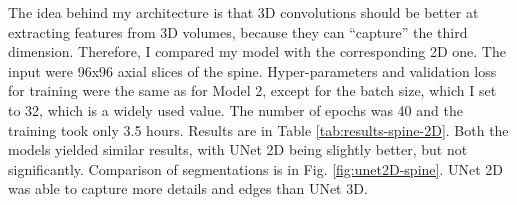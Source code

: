 The idea behind my architecture is that 3D convolutions should be better at  extracting features from 3D volumes, because they can ``capture'' the third dimension. Therefore, I compared my model with the corresponding 2D one. The input were 96x96 axial slices of the spine. Hyper-parameters and validation loss for training were the same as for Model 2, except for the batch size, which I set to 32, which is a widely used value. The number of epochs was 40 and the training took only 3.5 hours. Results are in Table \ref{tab:results-spine-2D}. Both the models yielded similar results, with UNet 2D being slightly better, but not significantly. Comparison of segmentations is in Fig. \ref{fig:unet2D-spine}. UNet 2D was able to capture more details and edges than UNet 3D. 






